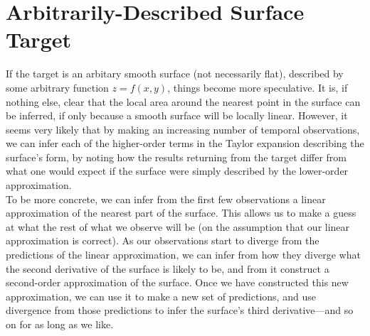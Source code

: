 \documentclass[11pt]{article}
\begin{document}
\section{Arbitrarily-Described Surface Target}

If the target is an arbitary smooth surface (not necessarily flat), described by some arbitrary function $z = f(x, y)$, things become more speculative. It is, if nothing else, clear that the local area around the nearest point in the surface can be inferred, if only because a smooth surface will be locally linear. However, it seems very likely that by making an increasing number of temporal observations, we can infer each of the higher-order terms in the Taylor expansion describing the surface's form, by noting how the results returning from the target differ from what one would expect if the surface were simply described by the lower-order approximation. \\

To be more concrete, we can infer from the first few observations a linear approximation of the nearest part of the surface. This allows us to make a guess at what the rest of what we observe will be (on the assumption that our linear approximation is correct). As our observations start to diverge from the predictions of the linear approximation, we can infer from how they diverge what the second derivative of the surface is likely to be, and from it construct a second-order approximation of the surface. Once we have constructed this new approximation, we can use it to make a new set of predictions, and use divergence from those predictions to infer the surface's third derivative---and so on for as long as we like. 
 
\end{document}
